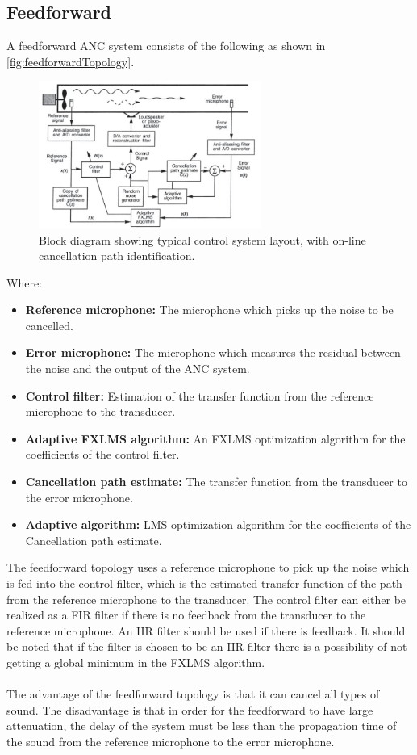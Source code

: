 \subsection{Feedforward}
A feedforward ANC system consists of the following as shown in \autoref{fig:feedforwardTopology}.
\begin{figure}[H]
	\centering
	\includegraphics[width=0.65\textwidth]{figures/BasicSystem/feedforward}
	\caption{Block diagram showing typical control system layout, with on-line cancellation path identification. \cite{Hansen2}}
	\label{fig:feedforwardTopology}
\end{figure}
Where:
\begin{itemize}
\item \textbf{Reference microphone:} The microphone which picks up the noise to be cancelled.
\item \textbf{Error microphone:} The microphone which measures the residual between the noise and the output of the ANC system.
\item \textbf{Control filter:} Estimation of the transfer function from the reference microphone to the transducer. 
\item \textbf{Adaptive FXLMS algorithm:} An FXLMS optimization algorithm for the coefficients of the control filter.
\item \textbf{Cancellation path estimate:} The transfer function from the transducer to the error microphone.
\item \textbf{Adaptive algorithm:} LMS optimization algorithm for the coefficients of the Cancellation path estimate.
\end{itemize}

The feedforward topology uses a reference microphone to pick up the noise which is fed into the control filter, which is the estimated transfer function of the path from the reference microphone to the transducer. The control filter can either be realized as a FIR filter if there is no feedback from the transducer to the reference microphone. An IIR filter should be used if there is feedback. It should be noted that if the filter is chosen to be an IIR filter there is a possibility of not getting a global minimum in the FXLMS algorithm.
\\\\
The advantage of the feedforward topology is that it can cancel all types of sound. The disadvantage is that in order for the feedforward to have large attenuation, the delay of the system must be less than the propagation time of the sound from the reference microphone to the error microphone.    




